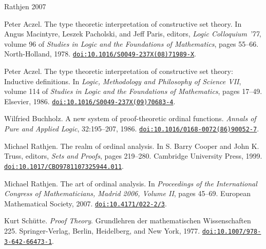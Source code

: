 \documentclass[11pt]{article}
\newcommand{\doi}[1]{\href{https://doi.org/#1}{\nolinkurl{doi:#1}}}
\theoremstyle{definition}
\theoremstyle{remark}
\begin{document}
\begin{thebibliography}{Rathjen 2007}

Peter Aczel.
\newblock The type theoretic interpretation of constructive set theory.
\newblock In Angus Macintyre, Leszek Pacholski, and Jeff Paris, editors,
  \emph{Logic Colloquium '77}, volume 96 of \emph{Studies in Logic and the
  Foundations of Mathematics}, pages 55--66. North-Holland, 1978.
\newblock \doi{10.1016/S0049-237X(08)71989-X}.

Peter Aczel.
\newblock The type theoretic interpretation of constructive set theory:
  Inductive definitions.
\newblock In \emph{Logic, Methodology and Philosophy of Science VII}, volume
  114 of \emph{Studies in Logic and the Foundations of Mathematics}, pages
  17--49. Elsevier, 1986.
\newblock \doi{10.1016/S0049-237X(09)70683-4}.

Wilfried Buchholz.
\newblock A new system of proof-theoretic ordinal functions.
\newblock \emph{Annals of Pure and Applied Logic}, 32:195--207, 1986.
\newblock \doi{10.1016/0168-0072(86)90052-7}.

Michael Rathjen.
\newblock The realm of ordinal analysis.
\newblock In S. Barry Cooper and John K. Truss, editors, \emph{Sets and
  Proofs}, pages 219--280. Cambridge University Press, 1999.
\newblock \doi{10.1017/CBO9781107325944.011}.

Michael Rathjen.
\newblock The art of ordinal analysis.
\newblock In \emph{Proceedings of the International Congress of
  Mathematicians, Madrid 2006, Volume II}, pages 45--69. European Mathematical
  Society, 2007.
\newblock \doi{10.4171/022-2/3}.

Kurt Sch\"utte.
\newblock \emph{Proof Theory}.
\newblock Grundlehren der mathematischen Wissenschaften 225. Springer-Verlag,
  Berlin, Heidelberg, and New York, 1977.
\newblock \doi{10.1007/978-3-642-66473-1}.

\end{thebibliography}
\end{document}
